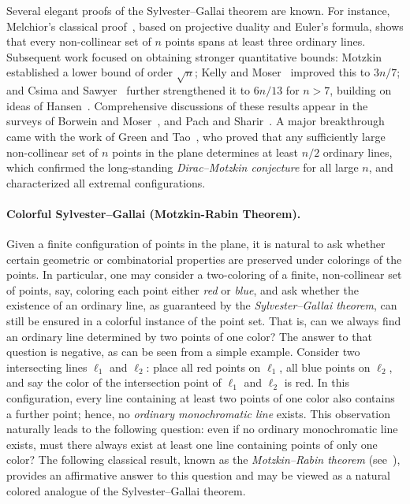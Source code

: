 \documentclass[a4paper,11pt,leqno]{article}
\begin{document}
Several elegant proofs of the Sylvester–Gallai theorem are known.
For instance, Melchior’s classical proof~\cite{melchior1941vielseite}, based on projective duality and Euler’s formula, shows that every non-collinear set of $n$ points spans at least three ordinary lines.
Subsequent work focused on obtaining stronger quantitative bounds: Motzkin~\cite{motzkin1951lines} established a lower bound of order $\sqrt{n}$; Kelly and Moser~\cite{kelly1958number} improved this to $3n/7$; and Csima and Sawyer~\cite{csimasawyer1993} further strengthened it to $6n/13$ for $n>7$, building on ideas of Hansen~\cite{hansen1981contributions}.
Comprehensive discussions of these results appear in the surveys of Borwein and Moser~\cite{borwein1990survey}, and Pach and Sharir~\cite{pach2009combinatorial}.
A major breakthrough came with the work of Green and Tao~\cite{greentao2013}, who proved that any sufficiently large non-collinear set of $n$ points in the plane determines at least $n/2$ ordinary lines, which confirmed the long-standing \emph{Dirac–Motzkin conjecture} for all large $n$, and characterized all extremal configurations. 

\paragraph{Colorful Sylvester--Gallai (Motzkin-Rabin Theorem).}
Given a finite configuration of points in the plane, it is natural to ask whether certain geometric or combinatorial properties are preserved under colorings of the points.
In particular, one may consider a two-coloring of a finite, non-collinear set of points, say, coloring each point either \emph{red} or \emph{blue}, and ask whether the existence of an ordinary line, as guaranteed by the \emph{Sylvester–Gallai theorem}, can still be ensured in a colorful instance of the point set. That is, can we always find an ordinary line determined by two points of one color? 
The answer to that question is negative, as can be seen from a simple example. Consider two intersecting lines $\ell_1$ and $\ell_2$: place all red points on $\ell_1$, all blue points on $\ell_2$, and say the color of the intersection point of $\ell_1$ and $\ell_2$ is red. In this configuration, every line containing at least two points of one color also contains a further point; hence, no \emph{ordinary monochromatic line} exists.
This observation naturally leads to the following question: even if no ordinary monochromatic line exists, must there always exist at least one line containing points of only one color?
The following classical result, known as the \emph{Motzkin–Rabin theorem} (see~\cite{borwein1990survey, erdHos1996extremal}), provides an affirmative answer to this question and may be viewed as a natural colored analogue of the Sylvester–Gallai theorem.
\end{document}
